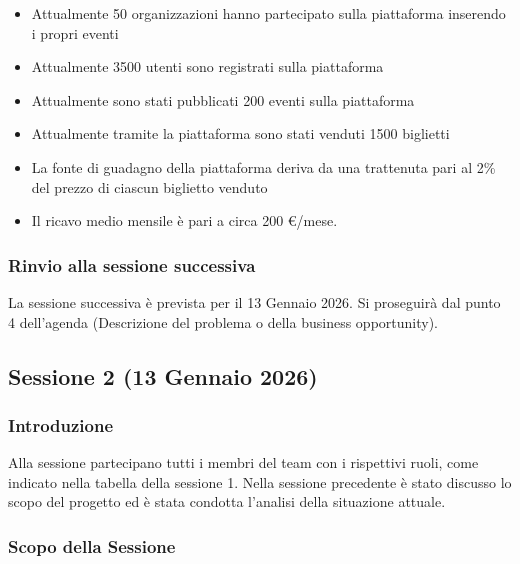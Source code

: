 \documentclass[11pt,a4paper]{article}
\begin{document}
\begin{itemize}
  {Come regione di test è stata scelta l’Emilia Romagna}
\item
  {Attualmente 50 organizzazioni hanno partecipato sulla piattaforma inserendo i propri eventi}
\item
  {Attualmente 3500 utenti sono registrati sulla piattaforma}
\item
  {Attualmente sono stati pubblicati 200 eventi sulla piattaforma}
\item
  {Attualmente tramite la piattaforma sono stati venduti 1500 biglietti}
\item
  {La fonte di guadagno della piattaforma deriva da una trattenuta pari al 2\% del prezzo di ciascun biglietto venduto}
\item
  {Il ricavo medio mensile è pari a circa 200 €/mese.}
\end{itemize}

\subsubsection{\texorpdfstring{{Rinvio alla sessione successiva}}{Rinvio alla sessione successiva}}\label{h.32lfxxg3kepp}

{La sessione successiva è prevista per il 13 Gennaio 2026. Si proseguirà dal punto 4 dell’agenda (Descrizione del problema o della business opportunity).}

\subsection{\texorpdfstring{{Sessione 2 (13 Gennaio 2026)}}{Sessione 2 (13 Gennaio 2026)}}\label{h.ip4byqgo69fp}

\subsubsection{\texorpdfstring{{Introduzione}}{Introduzione}}\label{h.61y5tpsuudc2}

{Alla sessione partecipano tutti i membri del team con i rispettivi ruoli, come indicato nella tabella della sessione 1. Nella sessione precedente è stato discusso lo scopo del progetto ed è stata condotta l’analisi della situazione attuale.}

\subsubsection{\texorpdfstring{{Scopo della Sessione}}{Scopo della Sessione}}\label{h.il29gd15sftx}
\end{document}
